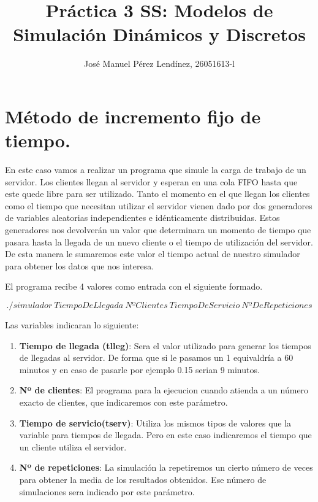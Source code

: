 \documentclass[]{article}
\title{Práctica 3 SS: Modelos de Simulación Dinámicos y Discretos}
\author{José Manuel Pérez Lendínez, 26051613-l}
\begin{document}
	\maketitle
	
	
	\newpage
	\tableofcontents
	\newpage

\section{Método de incremento fijo de tiempo.}
En este caso vamos a realizar un programa que simule la carga de trabajo de un servidor. Los clientes llegan al servidor y esperan en una cola FIFO hasta que este quede libre para ser utilizado. Tanto el momento en el que llegan los clientes como el tiempo que necesitan utilizar el servidor vienen dado por dos generadores de variables aleatorias independientes e idénticamente distribuidas. Estos generadores nos devolverán un valor que determinara un momento de tiempo que pasara hasta la llegada de un nuevo cliente o el tiempo de utilización del servidor. De esta manera le sumaremos este valor el tiempo actual de nuestro simulador para obtener los datos que nos interesa. 

El programa recibe 4 valores como entrada con el siguiente formado.

$$./simulador\ TiempoDeLlegada\ NºClientes\ TiempoDeServicio\ NºDeRepeticiones$$


Las variables indicaran lo siguiente:
	\begin{enumerate}
		\item \textbf{Tiempo de llegada (tlleg)}: Sera el valor utilizado para generar los tiempos de llegadas al servidor. De forma que si le pasamos un 1 equivaldría a 60 minutos y en caso de pasarle por ejemplo 0.15 serian 9 minutos.
		\item \textbf{Nº de clientes}: El programa para la ejecucion cuando atienda a un número exacto de clientes, que indicaremos con este parámetro.
		\item \textbf{Tiempo de servicio(tserv)}: Utiliza los mismos tipos de valores que la variable para tiempos de llegada. Pero en este caso indicaremos el tiempo que un cliente utiliza el servidor.
		\item \textbf{Nº de repeticiones}: La simulación la repetiremos un cierto número de veces para obtener la media de los resultados obtenidos. Ese número de simulaciones sera indicado por este parámetro.
	\end{enumerate}
\end{document}
